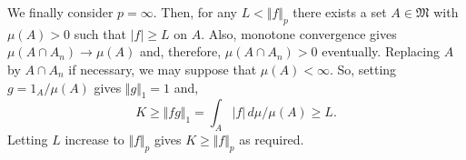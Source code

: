 \documentclass[12pt]{article}
\begin{document}
We finally consider $p=\infty$. Then, for any $L<\Vert f\Vert_p$ there exists a set $A\in\mathfrak{M}$ with $\mu(A)>0$ such that $|f|\ge L$ on $A$.
Also, monotone convergence gives $\mu(A\cap A_n)\rightarrow\mu(A)$ and, therefore, $\mu(A\cap A_n)>0$ eventually. Replacing $A$ by $A\cap A_n$ if necessary, we may suppose that $\mu(A)<\infty$. So, setting $g=1_A/\mu(A)$ gives $\Vert g\Vert_1=1$ and,
\begin{equation*}
K\ge\Vert fg\Vert_1=\int_A |f|\,d\mu / \mu(A)\ge L.
\end{equation*}
Letting $L$ increase to $\Vert f\Vert_p$ gives $K\ge \Vert f\Vert_p$ as required.

\end{document}
